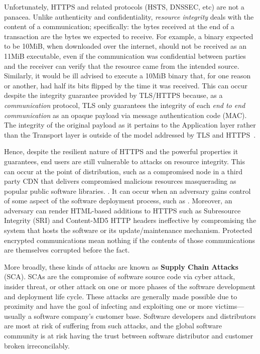 Unfortunately, HTTPS and related protocols (HSTS, DNSSEC, etc) are not a
panacea. Unlike authenticity and confidentiality, \textit{resource integrity}
deals with the content of a communication; specifically: the bytes received at
the end of a transaction are the bytes we expected to receive. For example, a
binary expected to be 10MiB, when downloaded over the internet, should not be
received as an 11MiB executable, even if the communication was confidential
between parties and the receiver can verify that the resource came from the
intended source. Similarly, it would be ill advised to execute a 10MiB binary
that, for one reason or another, had half its bits flipped by the time it was
received. This can occur despite the integrity guarantee provided by TLS/HTTPS
because, as a \textit{communication} protocol, TLS only guarantees the integrity
of each \textit{end to end communication} as an opaque payload via message
authentication code (MAC). The integrity of the original payload as it pertains
to the Application layer rather than the Transport layer is outside of the model
addressed by TLS and HTTPS~\cite{TLS1.2, HTTPS}.

Hence, despite the resilient nature of HTTPS and the powerful properties it
guarantees, end users are still vulnerable to attacks on resource integrity.
This can occur at the point of distribution, such as a compromised node in a
third party CDN that delivers compromised malicious resources masquerading as
popular public software libraries. . It can occur when an adversary gains control of some aspect of the
software deployment process, such as . Moreover, an
adversary can render HTML-based additions to HTTPS such as Subresource Integrity
(SRI) and Content-MD5 HTTP headers ineffective by compromising the system that
hosts the software or its update/maintenance mechanism. Protected encrypted
communications mean nothing if the contents of those communications are
themselves corrupted before the fact.

More broadly, these kinds of attacks are known as \textbf{Supply Chain Attacks}
(SCA). SCAs are the compromise of software source code via cyber attack, insider
threat, or other attack on one or more phases of the software development and
deployment life cycle. These attacks are generally made possible due to
proximity and have the goal of infecting and exploiting one or more
victims---usually a software company's customer base. Software developers and
distributors are most at risk of suffering from such attacks, and the global
software community is at risk having the trust between software distributor and
customer broken irreconcilably.

